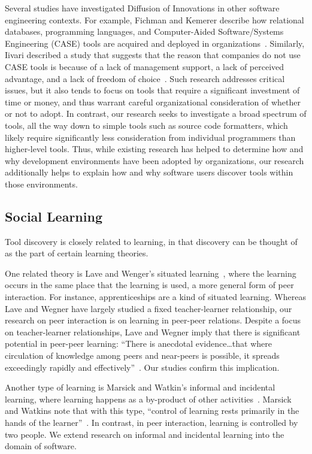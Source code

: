\documentclass[smallextended]{svjour3}
\newcommand\discovery{peer interaction\xspace}
\begin{document}
Several studies have investigated Diffusion of Innovations in
other software engineering contexts.
For example, Fichman and Kemerer describe how relational databases, programming
languages, and Computer-Aided Software/Systems Engineering (CASE) tools are
acquired and deployed in organizations~\cite{fichman99}. 
Similarly, Iivari described a study that suggests that the reason that
companies do not use CASE tools is because of a lack of management support, a 
lack of perceived advantage, and a lack of freedom of choice~\cite{iivari}.
Such research addresses critical issues, but it also
tends to focus on tools that require a significant investment of time 
or money, and thus warrant careful organizational consideration of whether or
not to adopt. 
In contrast, our research seeks to investigate a broad spectrum of tools, all
the way down to simple tools such as source code formatters, which likely require
significantly less consideration from individual programmers than higher-level
tools. 
Thus, while existing research has helped to determine
how and why development environments have been adopted by organizations, our
research additionally helps to explain how and why software users discover tools within
those environments.

\subsection{Social Learning}

\noindent
Tool discovery is closely related to learning, in that discovery can be thought 
of as the part of certain learning theories.

One related theory is Lave and Wenger's situated learning~\cite{lave}, where the learning
occurs in the same place that the learning is used, a more general form of
\discovery.
For instance, apprenticeships are a kind of situated learning. 
Whereas Lave and Wegner have largely studied a fixed teacher-learner
relationship, our research on \discovery is on learning in peer-peer relations. 
Despite a focus on teacher-learner relationships, Lave and Wegner imply that
there is significant potential in peer-peer learning: ``There is anecdotal
evidence\ldots that where circulation of knowledge among peers and near-peers
is possible, it spreads exceedingly rapidly and effectively''~\cite{lave}.
Our studies confirm this implication.

Another type of learning is Marsick and Watkin's informal and incidental
learning, where learning happens as a by-product of other
activities~\cite{marsick01}. 
Marsick and Watkins note that with this type, ``control of learning
rests primarily in the hands of the learner''~\cite{marsick01}.
In contrast, in \discovery, learning is controlled by two people. 
We extend research on informal and incidental learning 
into the domain of software.
\end{document}
